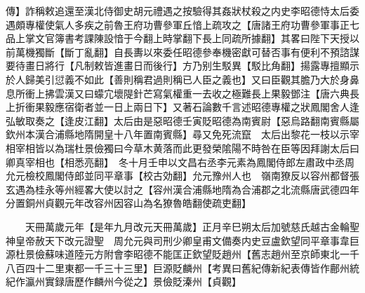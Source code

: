 傳】詐稱敕追還至漢北侍御史胡元禮遇之按驗得其姦狀杖殺之内史李昭德恃太后委遇頗專權使氣人多疾之前魯王府功曹參軍丘愔上疏攻之【唐諸王府功曹參軍事正七品上掌文官簿書考課陳設愔于今翻上時掌翻下長上同疏所據翻】其畧曰陛下天授以前萬機獨斷【斷丁亂翻】自長夀以來委任昭德參奉機密獻可替否事有便利不預諮謀要待畫日將行【凡制敕皆進畫日而後行】方乃别生駁異【駁比角翻】揚露專擅顯示於人歸美引愆義不如此【善則稱君過則稱已人臣之義也】又曰臣觀其膽乃大於身鼻息所衝上拂雲漢又曰蠓宂壞隄針芒寫氣權重一去收之極難長上果毅鄧注【唐六典長上折衝果毅應宿衛者並一日上兩日下】又著石論數千言述昭德專權之狀鳳閣舍人逢弘敏取奏之【逢皮江翻】太后由是惡昭德壬寅貶昭德為南賓尉【惡烏路翻南賓縣屬欽州本漢合浦縣地隋開皇十八年置南賓縣】尋又免死流竄　太后出黎花一枝以示宰相宰相皆以為瑞杜景儉獨曰今草木黄落而此更發榮隂陽不時咎在臣等因拜謝太后曰卿真宰相也【相悉亮翻】　冬十月壬申以文昌右丞李元素為鳳閣侍郎左肅政中丞周允元檢校鳳閣侍郎並同平章事【校古効翻】允元豫州人也　嶺南獠反以容州都督張玄遇為桂永等州經畧大使以討之【容州漢合浦縣地隋為合浦郡之北流縣唐武德四年分置銅州貞觀元年改容州因容山為名獠魯皓翻使疏吏翻】

　　天冊萬歲元年【是年九月改元天冊萬歲】正月辛巳朔太后加號慈氏越古金輪聖神皇帝赦天下改元證聖　周允元與司刑少卿皇甫文備奏内史豆盧欽望同平章事韋巨源杜景儉蘇味道陸元方附會李昭德不能匡正欽望貶趙州【舊志趙州至京師東北一千八百四十二里東都一千三十三里】巨源貶麟州【考異曰舊紀傳新紀表傳皆作鄜州統紀作瀛州實録唐歷作麟州今從之】景儉貶溱州【貞觀】

